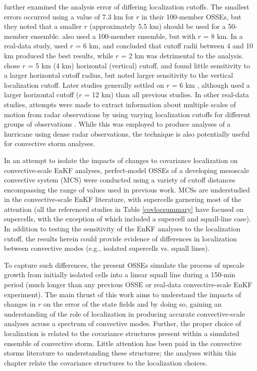 \citet{cayaetal05} further examined the analysis error of differing localization cutoffs. The smallest errors occurred using a value of 7.3 km for \( r \) in their 100-member OSSEs, but they noted that a smaller \( r \) (approximately 5.5 km) should be used for a 50-member ensemble. \citet{tongxue05} also used a 100-member ensemble, but with \( r \) = 8 km. In a real-data study, \citet{dowelletal04} used \( r \) = 6 km, and concluded that cutoff radii between 4 and 10 km produced the best results, while \( r \) = 2 km was detrimental to the analysis. \citet{aksoyetal09} chose \( r \) = 5 km (4 km) horizontal (vertical) cutoff, and found little sensitivity to a larger horizontal cutoff radius, but noted larger sensitivity to the vertical localization cutoff. Later studies generally settled on \( r \) = 6 km \citep{dowellwicker09,dowelletal11,dongetal11}, although \citet{dawsonetal12} used a larger horizontal cutoff (\( r \) = 12 km) than all previous studies. In other real-data studies, attempts were made to extract information about multiple scales of motion from radar observations by using varying localization cutoffs for different groups of observations \citep{zhangetal09}. While this was employed to produce analyses of a hurricane using dense radar observations, the technique is also potentially useful for convective storm analyses.

In an attempt to isolate the impacts of changes to covariance localization on convective-scale EnKF analyses, perfect-model OSSEs of a developing mesoscale convective system (MCS) were conducted using a variety of cutoff distances encompassing the range of values used in previous work. MCSs are understudied in the convective-scale EnKF literature, with supercells garnering most of the attention (all the referenced studies in Table \ref{covlocsummary} have focused on supercells, with the exception of \citet{aksoyetal09} which included a supercell and squall-line case). In addition to testing the sensitivity of the EnKF analyses to the localization cutoff, the results herein could provide evidence of differences in localization between convective modes (e.g., isolated supercells vs. squall lines).

To capture such differences, the present OSSEs simulate the process of upscale growth from initially isolated cells into a linear squall line during a 150-min period (much longer than any previous OSSE or real-data convective-scale EnKF experiment). The main thrust of this work aims to understand the impacts of changes in \(r\) on the error of the state fields and by doing so, gaining an understanding of the role of localization in producing accurate convective-scale analyses across a spectrum of convective modes. Further, the proper choice of localization is related to the covariance structures present within a simulated ensemble of convective storm. Little attention has been paid in the convective storms literature to understanding these structures; the analyses within this chapter relate the covariance structures to the localization choices.

